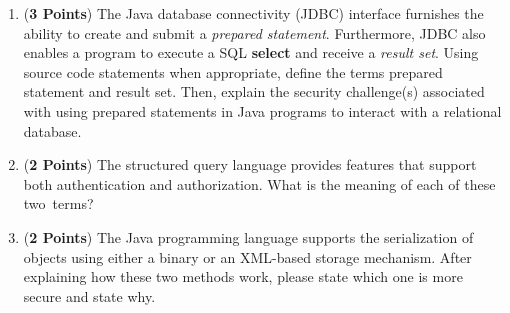 \documentclass[12pt]{article}
\begin{document}
\begin{enumerate}
\begin{enumerate}
                  \item ({\bf 3 Points}) The Java database connectivity (JDBC) interface furnishes the ability to create
                    and submit a {\em prepared statement}.  Furthermore, JDBC also enables a program to execute a SQL
                    {\bf select} and receive a {\em result set}.  Using source code statements when appropriate, define
                    the terms prepared statement and result set. Then, explain the security challenge(s) associated with
                    using prepared statements in Java programs to interact with a relational database.

                  \item ({\bf 2 Points}) The structured query language provides features that support both
                    authentication and authorization. What is the meaning of each of these \mbox{two terms}?

                  \item ({\bf 2 Points}) The Java programming language supports the serialization of objects using
                    either a binary or an XML-based storage mechanism. After explaining how these two methods work, please
                    state which one is more secure and state why.
                    \end{enumerate}

                \end{enumerate}

                
\end{document}
